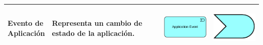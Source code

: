 {\begin{longtable}{|p{0.15\linewidth}|p{0.45\linewidth}|p{0.2\linewidth} p{0.2\linewidth}|}
    	Evento de Aplicación 
    	&
    	Representa un cambio de estado de la aplicación. 
    	&
    	\begin{center}
    		\includegraphics[width=1\linewidth]{imgs/Aplication_event.pdf}
    	\end{center} &
    	\begin{center}
    		\includegraphics[width=0.7\linewidth]{imgs/event.pdf}
    	\end{center}
    	\\ \hline
    	

\end{longtable}}
